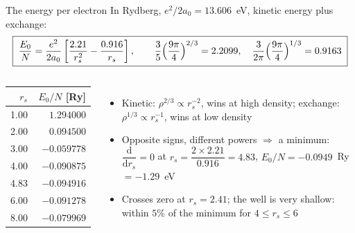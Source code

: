 \documentclass[aspectratio=169,10pt]{beamer}
\newcommand{\dd}{\mathrm{d}}
\begin{document}
\begin{frame}{The energy per electron}
  In Rydberg, $e^2/2a_0=13.606$~eV, kinetic energy plus exchange:
  \[
    \boxed{\;\frac{E_0}{N}=\frac{e^2}{2a_0}\left[\frac{2.21}{r_s^2}-\frac{0.916}{r_s}\right],\qquad
    \frac35\Bigl(\frac{9\pi}{4}\Bigr)^{2/3}=2.2099,\quad\frac{3}{2\pi}\Bigl(\frac{9\pi}{4}\Bigr)^{1/3}=0.9163\;}
  \]
  \begin{columns}[T]
    \begin{center}\small
    \begin{tabular}{@{}rr@{}}\toprule
    $r_s$ & $E_0/N$ [Ry]\\\midrule
    1.00 & $\phantom{-}1.294000$\\
    2.00 & $\phantom{-}0.094500$\\
    3.00 & $-0.059778$\\
    4.00 & $-0.090875$\\
    4.83 & $-0.094916$\\
    6.00 & $-0.091278$\\
    8.00 & $-0.079969$\\\bottomrule
    \end{tabular}
    \end{center}
    \begin{itemize}
      \item Kinetic: $\rho^{2/3}\propto r_s^{-2}$, wins at high density; exchange: $\rho^{1/3}\propto r_s^{-1}$, wins at low density
      \item Opposite signs, different powers $\Rightarrow$ a minimum: $\dfrac{\dd}{\dd r_s}=0$ at $r_s=\dfrac{2\times2.21}{0.916}=4.83$, $E_0/N=-0.0949$~Ry $=-1.29$~eV
      \item Crosses zero at $r_s=2.41$; the well is \alert{very shallow}: within $5\%$ of the minimum for $4\le r_s\le6$
    \end{itemize}
  \end{columns}
\end{frame}
\end{document}
